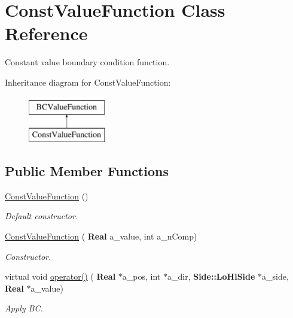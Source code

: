 \hypertarget{class_const_value_function}{}\section{Const\+Value\+Function Class Reference}
\label{class_const_value_function}


Constant value boundary condition function.  


Inheritance diagram for Const\+Value\+Function\+:\begin{figure}[H]
\begin{center}
\leavevmode
\includegraphics[height=2.000000cm]{class_const_value_function}
\end{center}
\end{figure}
\subsection*{Public Member Functions}
\begin{DoxyCompactItemize}
\item 
\mbox{\label{class_const_value_function_a3022feb84ef9e65bba61c2fe27a3bcd3}} 
\hyperlink{class_const_value_function_a3022feb84ef9e65bba61c2fe27a3bcd3}{Const\+Value\+Function} ()
\begin{DoxyCompactList}\small\item\em Default constructor. \end{DoxyCompactList}\item 
\mbox{\label{class_const_value_function_a2c0a36991ee9548815186ac1db46d133}} 
\hyperlink{class_const_value_function_a2c0a36991ee9548815186ac1db46d133}{Const\+Value\+Function} (\textbf{ Real} a\+\_\+value, int a\+\_\+n\+Comp)
\begin{DoxyCompactList}\small\item\em Constructor. \end{DoxyCompactList}\item 
\mbox{\label{class_const_value_function_a417fb6f37a91828d252e433b3992e585}} 
virtual void \hyperlink{class_const_value_function_a417fb6f37a91828d252e433b3992e585}{operator()} (\textbf{ Real} $\ast$a\+\_\+pos, int $\ast$a\+\_\+dir, \textbf{ Side\+::\+Lo\+Hi\+Side} $\ast$a\+\_\+side, \textbf{ Real} $\ast$a\+\_\+value)
\begin{DoxyCompactList}\small\item\em Apply BC. \end{DoxyCompactList}\end{DoxyCompactItemize}

